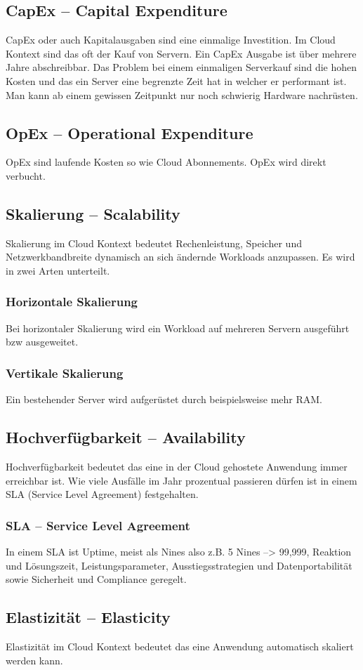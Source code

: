 \subsection{CapEx – Capital Expenditure}
CapEx oder auch Kapitalausgaben sind eine einmalige Investition. Im Cloud Kontext sind das oft der Kauf von Servern. Ein CapEx Ausgabe ist über mehrere Jahre abschreibbar. Das Problem bei einem einmaligen Serverkauf sind die hohen Kosten und das ein Server eine begrenzte Zeit hat in welcher er performant ist. Man kann ab einem gewissen Zeitpunkt nur noch schwierig Hardware nachrüsten.
\subsection{OpEx – Operational Expenditure}
OpEx sind laufende Kosten so wie Cloud Abonnements. OpEx wird direkt verbucht.
\subsection{Skalierung – Scalability}
Skalierung im Cloud Kontext bedeutet Rechenleistung, Speicher und Netzwerkbandbreite dynamisch an sich ändernde Workloads anzupassen. Es wird in zwei Arten unterteilt.
\subsubsection{Horizontale Skalierung}
Bei horizontaler Skalierung wird ein Workload auf mehreren Servern ausgeführt bzw ausgeweitet.
\subsubsection{Vertikale Skalierung}
Ein bestehender Server wird aufgerüstet durch beispielsweise mehr RAM.
\subsection{Hochverfügbarkeit – Availability}
Hochverfügbarkeit bedeutet das eine in der Cloud gehostete Anwendung immer erreichbar ist. Wie viele Ausfälle im Jahr prozentual passieren dürfen ist in einem SLA (Service Level Agreement) festgehalten.
\subsubsection{SLA – Service Level Agreement}
In einem SLA ist Uptime, meist als Nines also z.B. 5 Nines --> 99,999, Reaktion und Lösungszeit, Leistungsparameter, Ausstiegsstrategien und Datenportabilität sowie Sicherheit und Compliance geregelt.
\subsection{Elastizität – Elasticity}
Elastizität im Cloud Kontext bedeutet das eine Anwendung automatisch skaliert werden kann.
